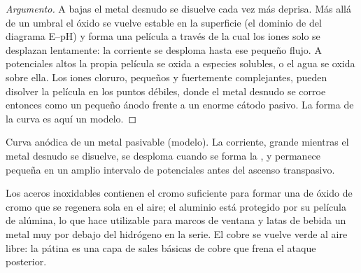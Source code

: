 \begin{proof}[Argumento]
A  bajas el metal desnudo se disuelve cada vez más deprisa. Más allá de un
umbral el óxido se vuelve estable en la superficie (el dominio de  del
diagrama E--pH) y forma una película a través de la cual los iones solo se desplazan lentamente: la
corriente se desploma hasta ese pequeño flujo. A potenciales altos la propia película se
oxida a especies solubles, o el agua se oxida sobre ella. Los iones cloruro, pequeños
y fuertemente complejantes, pueden disolver la película en los puntos débiles, donde el
metal desnudo se corroe entonces como un pequeño ánodo frente a un enorme cátodo pasivo. La
forma de la curva es aquí un modelo.
\end{proof}

\begin{omfigure}

{\small Curva anódica de un metal pasivable (modelo). La corriente, grande mientras
el metal desnudo se disuelve, se desploma cuando se forma la , y permanece
pequeña en un amplio intervalo de potenciales antes del ascenso transpasivo.}
\end{omfigure}

Los aceros inoxidables contienen el cromo suficiente para formar una  de óxido de cromo
que se regenera sola en el aire; el aluminio está protegido por su película de alúmina, lo que
hace utilizable para marcos de ventana y latas de bebida un metal muy por debajo del hidrógeno en la
serie. El cobre se vuelve verde al aire libre: la pátina es una capa de
sales básicas de cobre que frena el ataque posterior.

